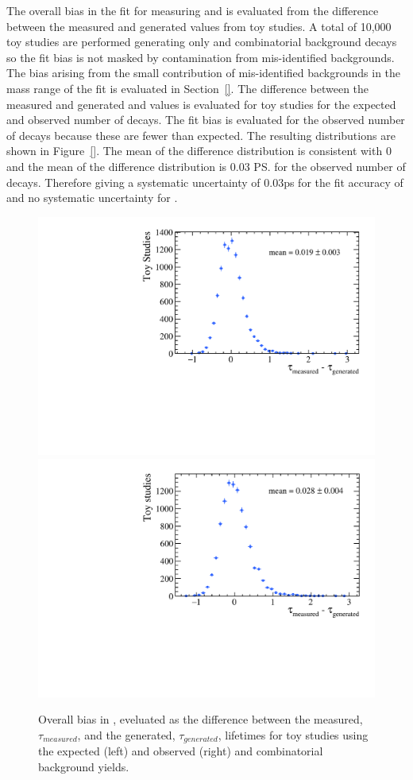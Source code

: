 The overall bias in the fit for measuring \tmumu and \Gmumu is evaluated from the difference between the measured and generated values from toy studies. A total of 10,000 toy studies are performed generating only \bsmumu and combinatorial background decays so the fit bias is not masked by contamination from mis-identified backgrounds.  The bias arising from the small contribution of mis-identified backgrounds in the mass range of the fit is evaluated in Section~\ref{}. The difference between the measured and generated \tmumu and \Gmumu values is evaluated for toy studies for the expected and observed number of \bsmumu decays. The fit bias is evaluated for the observed number of decays because these are fewer than expected. The resulting distributions are shown in Figure~\ref{}. The mean of the \Gmumu difference distribution is consistent with 0 and the mean of the \tmumu difference distribution is 0.03 \ps for the observed number of decays.  Therefore giving a systematic uncertainty of 0.03ps for the fit accuracy of \tmumu and no systematic uncertainty for \Gmumu.

\begin{figure}[htbp]
    \centering
        \includegraphics[width=0.49 \textwidth]{./Figs/LifetimeSystematics/tau_meas-tau_gen.pdf}
        \includegraphics[width=0.49 \textwidth]{./Figs/LifetimeSystematics/tau_meas-tau_gen_observed.pdf}
    \caption{Overall bias in \tmumu, eveluated as the difference between the measured, $\tau_{measured}$, and the generated, $\tau_{generated}$, lifetimes for toy studies using the expected (left) and observed (right) \bsmumu and combinatorial background yields.}
    \label{fig:BsmumuYieldPulls}
\end{figure}


